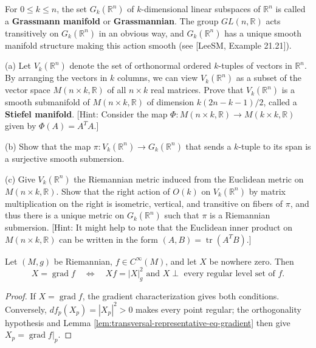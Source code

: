 \begin{exercise}\label{prob:grassmann-stiefel-manifolds}
For $0 \le k \le n$, the set $G_k(\mathbb{R}^n)$ of $k$-dimensional linear subspaces of $\mathbb{R}^n$ is called a \textbf{Grassmann manifold} or \textbf{Grassmannian}. The group $GL(n,\mathbb{R})$ acts transitively on $G_k(\mathbb{R}^n)$ in an obvious way, and $G_k(\mathbb{R}^n)$ has a unique smooth manifold structure making this action smooth (see [LeeSM, Example 21.21]).

(a) Let $V_k(\mathbb{R}^n)$ denote the set of orthonormal ordered $k$-tuples of vectors in $\mathbb{R}^n$. By arranging the vectors in $k$ columns, we can view $V_k(\mathbb{R}^n)$ as a subset of the vector space $M(n \times k, \mathbb{R})$ of all $n \times k$ real matrices. Prove that $V_k(\mathbb{R}^n)$ is a smooth submanifold of $M(n \times k, \mathbb{R})$ of dimension $k(2n - k - 1)/2$, called a \textbf{Stiefel manifold}. [Hint: Consider the map $\Phi: M(n \times k, \mathbb{R}) \to M(k \times k, \mathbb{R})$ given by $\Phi(A) = A^T A$.]

(b) Show that the map $\pi: V_k(\mathbb{R}^n) \to G_k(\mathbb{R}^n)$ that sends a $k$-tuple to its span is a surjective smooth submersion.

(c) Give $V_k(\mathbb{R}^n)$ the Riemannian metric induced from the Euclidean metric on $M(n \times k, \mathbb{R})$. Show that the right action of $O(k)$ on $V_k(\mathbb{R}^n)$ by matrix multiplication on the right is isometric, vertical, and transitive on fibers of $\pi$, and thus there is a unique metric on $G_k(\mathbb{R}^n)$ such that $\pi$ is a Riemannian submersion. [Hint: It might help to note that the Euclidean inner product on $M(n \times k, \mathbb{R})$ can be written in the form $(A,B) = \operatorname{tr}(A^T B)$.]
\end{exercise}


\begin{proposition}\label{prop:gradient-characterization}


Let $(M,g)$ be Riemannian, $f\in C^\infty(M)$, and let $X$ be nowhere zero.
Then
\[
X=\operatorname{grad}f\quad\Longleftrightarrow\quad Xf=|X|_g^2\text{ and }X\perp\text{ every regular level set of }f.
\]
\end{proposition}

\begin{proof}

\sketch If $X=\operatorname{grad}f$, the gradient characterization gives both conditions. Conversely, $df_p(X_p)=|X_p|^2>0$ makes every point regular; the orthogonality hypothesis and Lemma \ref{lem:transversal-representative-eq-gradient} then give $X_p=\operatorname{grad}f|_p$.
\end{proof}

